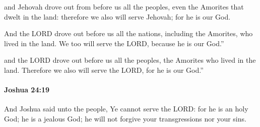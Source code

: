 			\begin{versebox}
					\item[BHS] 
					\item[ASV] and Jehovah drove out from before us all the peoples, even the Amorites that dwelt in the land: therefore we also will serve Jehovah; for he is our God.
					\item[NIV] And the LORD drove out before us all the nations, including the Amorites, who lived in the land. We too will serve the LORD, because he is our God.”
					\item[NRSV] and the LORD drove out before us all the peoples, the Amorites who lived in the land. Therefore we also will serve the LORD, for he is our God.”
			\end{versebox}

		\paragraph{Joshua 24:19} %
			\label{JOSHUA-24-19}

			And Joshua said unto the people, Ye cannot serve the LORD: for he is an holy God; he is a jealous God; he will not forgive your transgressions nor your sins.

